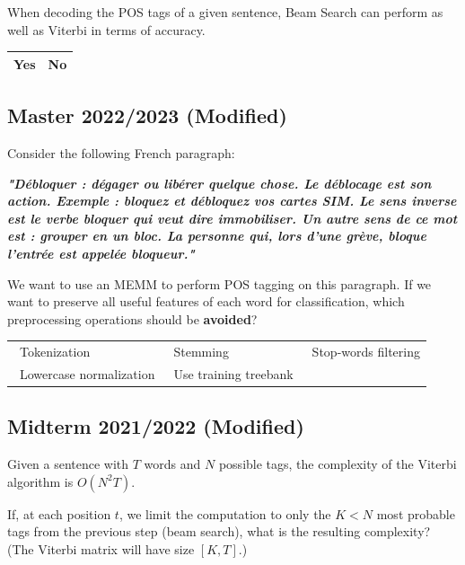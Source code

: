 \documentclass{../extra/aakpract/aakpract}
\begin{document}
	When decoding the POS tags of a given sentence, Beam Search can perform as well as Viterbi in terms of accuracy.
	
	\begin{center}
		\begin{tabular}{|ll|}
			\hline
			\Circle Yes & \Circle No \\
			\hline
		\end{tabular}
	\end{center}
	
	\subsection{Master 2022/2023 (Modified)}
	
	Consider the following French paragraph: 
	
	\textbf{\small\itshape"Débloquer : dégager ou libérer quelque chose. Le déblocage est son action. Exemple : bloquez et débloquez vos cartes SIM. Le sens inverse est le verbe bloquer qui veut dire immobiliser. Un autre sens de ce mot est : grouper en un bloc. La personne qui, lors d’une grève, bloque l’entrée est appelée bloqueur."}
	
	We want to use an MEMM to perform POS tagging on this paragraph. 
	If we want to preserve all useful features of each word for classification, which preprocessing operations should be \textbf{avoided}?
	
	\begin{center}
		\begin{tabular}{|lll|}
			\hline
			\Square\ Tokenization & \Square\ Stemming & \Square\ Stop-words filtering \\
			\Square\ Lowercase normalization & \Square\ Use training treebank & \\
			\hline
		\end{tabular}
	\end{center}
	
	\subsection{Midterm 2021/2022 (Modified)}
	
	Given a sentence with $T$ words and $N$ possible tags, the complexity of the Viterbi algorithm is $O(N^2T)$.
	
	If, at each position $t$, we limit the computation to only the $K < N$ most probable tags from the previous step (beam search), what is the resulting complexity? (The Viterbi matrix will have size $[K, T]$.)
	
\end{document}
